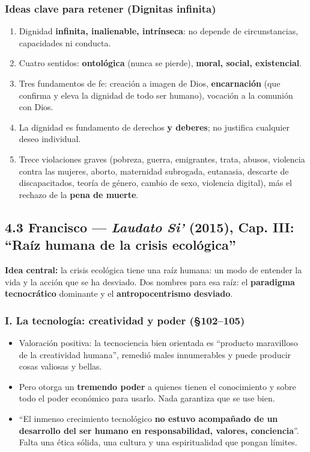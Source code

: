 \documentclass[10pt,a4paper]{article}
\begin{document}
\subsubsection{Ideas clave para retener (Dignitas infinita)}
\begin{enumerate}
\item Dignidad \textbf{infinita, inalienable, intrínseca}: no depende de circunstancias, capacidades ni conducta.
\item Cuatro sentidos: \textbf{ontológica} (nunca se pierde), \textbf{moral, social, existencial}.
\item Tres fundamentos de fe: creación a imagen de Dios, \textbf{encarnación} (que confirma y eleva la dignidad de todo ser humano), vocación a la comunión con Dios.
\item La dignidad es fundamento de derechos \textbf{y deberes}; no justifica cualquier deseo individual.
\item Trece violaciones graves (pobreza, guerra, emigrantes, trata, abusos, violencia contra las mujeres, aborto, maternidad subrogada, eutanasia, descarte de discapacitados, teoría de género, cambio de sexo, violencia digital), más el rechazo de la \textbf{pena de muerte}.
\end{enumerate}



\subsection{4.3 Francisco --- \textit{Laudato Si'} (2015), Cap. III: ``Raíz humana de la crisis ecológica''}

\noindent \textbf{Idea central:} la crisis ecológica tiene una raíz humana: un modo de entender la vida y la acción que se ha desviado. Dos nombres para esa raíz: el \textbf{paradigma tecnocrático} dominante y el \textbf{antropocentrismo desviado}.\par\smallskip

\subsubsection{I. La tecnología: creatividad y poder (\S{}102--105)}
\begin{itemize}
\item Valoración positiva: la tecnociencia bien orientada es ``producto maravilloso de la creatividad humana'', remedió males innumerables y puede producir cosas valiosas y bellas.
\item Pero otorga un \textbf{tremendo poder} a quienes tienen el conocimiento y sobre todo el poder económico para usarlo. Nada garantiza que se use bien.
\item ``El inmenso crecimiento tecnológico \textbf{no estuvo acompañado de un desarrollo del ser humano en responsabilidad, valores, conciencia}''. Falta una ética sólida, una cultura y una espiritualidad que pongan límites.
\end{itemize}
\end{document}
